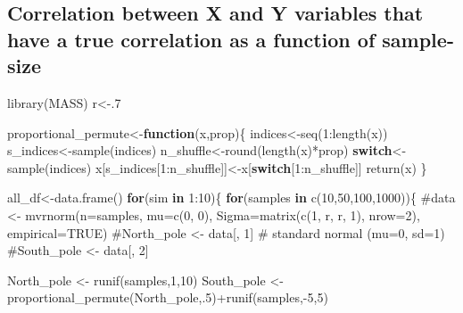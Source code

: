 \documentclass[
  letterpaper,
  DIV=11,
  numbers=noendperiod]{scrreprt}
\newenvironment{Shaded}{\begin{snugshade}}{\end{snugshade}}
\newcommand{\CommentTok}[1]{\textcolor[rgb]{0.37,0.37,0.37}{#1}}
\newcommand{\ControlFlowTok}[1]{\textcolor[rgb]{0.00,0.23,0.31}{\textbf{#1}}}
\newcommand{\DecValTok}[1]{\textcolor[rgb]{0.68,0.00,0.00}{#1}}
\newcommand{\FunctionTok}[1]{\textcolor[rgb]{0.28,0.35,0.67}{#1}}
\newcommand{\NormalTok}[1]{\textcolor[rgb]{0.00,0.23,0.31}{#1}}
\newcommand{\OtherTok}[1]{\textcolor[rgb]{0.00,0.23,0.31}{#1}}
\newcommand{\SpecialCharTok}[1]{\textcolor[rgb]{0.37,0.37,0.37}{#1}}
\begin{document}
\subsection{Correlation between X and Y variables that have a true
correlation as a function of
sample-size}\label{correlation-between-x-and-y-variables-that-have-a-true-correlation-as-a-function-of-sample-size}

\begin{Shaded}
\begin{Highlighting}[]
\FunctionTok{library}\NormalTok{(MASS)}
\NormalTok{r}\OtherTok{\textless{}{-}}\NormalTok{.}\DecValTok{7}

\NormalTok{proportional\_permute}\OtherTok{\textless{}{-}}\ControlFlowTok{function}\NormalTok{(x,prop)\{}
\NormalTok{  indices}\OtherTok{\textless{}{-}}\FunctionTok{seq}\NormalTok{(}\DecValTok{1}\SpecialCharTok{:}\FunctionTok{length}\NormalTok{(x))}
\NormalTok{  s\_indices}\OtherTok{\textless{}{-}}\FunctionTok{sample}\NormalTok{(indices)}
\NormalTok{  n\_shuffle}\OtherTok{\textless{}{-}}\FunctionTok{round}\NormalTok{(}\FunctionTok{length}\NormalTok{(x)}\SpecialCharTok{*}\NormalTok{prop)}
  \ControlFlowTok{switch}\OtherTok{\textless{}{-}}\FunctionTok{sample}\NormalTok{(indices)}
\NormalTok{  x[s\_indices[}\DecValTok{1}\SpecialCharTok{:}\NormalTok{n\_shuffle]]}\OtherTok{\textless{}{-}}\NormalTok{x[}\ControlFlowTok{switch}\NormalTok{[}\DecValTok{1}\SpecialCharTok{:}\NormalTok{n\_shuffle]]}
  \FunctionTok{return}\NormalTok{(x)}
\NormalTok{\}}

\NormalTok{all\_df}\OtherTok{\textless{}{-}}\FunctionTok{data.frame}\NormalTok{()}
\ControlFlowTok{for}\NormalTok{(sim }\ControlFlowTok{in} \DecValTok{1}\SpecialCharTok{:}\DecValTok{10}\NormalTok{)\{}
  \ControlFlowTok{for}\NormalTok{(samples }\ControlFlowTok{in} \FunctionTok{c}\NormalTok{(}\DecValTok{10}\NormalTok{,}\DecValTok{50}\NormalTok{,}\DecValTok{100}\NormalTok{,}\DecValTok{1000}\NormalTok{))\{}
    \CommentTok{\#data \textless{}{-} mvrnorm(n=samples, mu=c(0, 0), Sigma=matrix(c(1, r, r, 1), nrow=2), empirical=TRUE)}
    \CommentTok{\#North\_pole \textless{}{-} data[, 1]  \# standard normal (mu=0, sd=1)}
    \CommentTok{\#South\_pole \textless{}{-} data[, 2] }
    
\NormalTok{    North\_pole }\OtherTok{\textless{}{-}} \FunctionTok{runif}\NormalTok{(samples,}\DecValTok{1}\NormalTok{,}\DecValTok{10}\NormalTok{)}
\NormalTok{    South\_pole }\OtherTok{\textless{}{-}} \FunctionTok{proportional\_permute}\NormalTok{(North\_pole,.}\DecValTok{5}\NormalTok{)}\SpecialCharTok{+}\FunctionTok{runif}\NormalTok{(samples,}\SpecialCharTok{{-}}\DecValTok{5}\NormalTok{,}\DecValTok{5}\NormalTok{)}


\end{Highlighting}
\end{Shaded}
\end{document}
